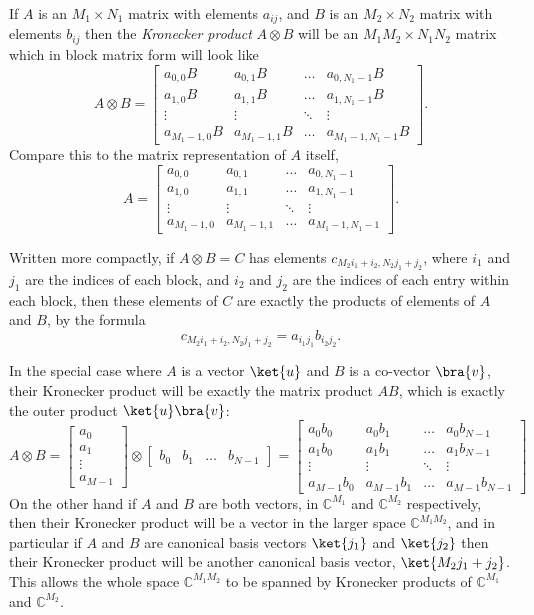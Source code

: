If $A$ is an $M_1 \times N_1$ matrix with elements $a_{ij}$, and $B$ is an $M_2 \times N_2$ matrix with elements $b_{ij}$ then the \emph{Kronecker product} $A \otimes B$ will be an $M_1M_2 \times N_1N_2$ matrix which in block matrix form will look like
\[
A\otimes B = \left[\begin{matrix}
		a_{0,0}B & a_{0,1}B & \dots & a_{0,N_1-1}B\\
		a_{1,0}B & a_{1,1}B & \dots & a_{1,N_1-1}B\\
		\vdots & \vdots & \ddots & \vdots\\
		a_{M_1-1,0}B & a_{M_1-1,1}B & \dots & a_{M_1-1,N_1-1}B
	\end{matrix}\right].
\]
Compare this to the matrix representation of $A$ itself,
\[
	A = \left[\begin{matrix}
	a_{0,0} & a_{0,1} & \dots & a_{0,{N_1-1}}\\
	a_{1,0} & a_{1,1} & \dots & a_{1,{N_1-1}}\\
	\vdots & \vdots & \ddots & \vdots\\
	a_{{M_1-1},0} & a_{{M_1-1},1} & \dots & a_{{M_1-1},{N_1-1}}
\end{matrix}\right].
\]

Written more compactly, if $A\otimes B = C$ has elements $c_{M_2i_1 + i_2,N_2j_1+j_2}$, where $i_1$ and $j_1$ are the indices of each block, and $i_2$ and $j_2$ are the indices of each entry within each block, then these elements of $C$ are exactly the products of elements of $A$ and $B$, by the formula
\[c_{M_2i_1 + i_2,N_2j_1+j_2} = a_{i_1j_1}b_{i_2j_2}.\]

In the special case where $A$ is a vector $\ket{u}$ and $B$ is a co-vector $\bra{v}$, their Kronecker product will be exactly the matrix product $AB$, which is exactly the outer product $\ket{u}\bra{v}$:
\[
A \otimes B =
\left[\begin{matrix}
	a_0\\a_1\\\vdots\\a_{M-1}
\end{matrix}\right]
\otimes
\left[\begin{matrix}
	b_0&b_1&\dots&b_{N-1}
\end{matrix}\right]
=
\left[\begin{matrix}
	a_0b_0 & a_0b_1 & \dots & a_0b_{N-1}\\
	a_1b_0 & a_1b_1 & \dots & a_1b_{N-1}\\
	\vdots & \vdots & \ddots & \vdots\\
	a_{M-1}b_0 & a_{M-1}b_1 & \dots & a_{M-1}b_{N-1}
\end{matrix}\right]
\]
On the other hand if $A$ and $B$ are both vectors, in $\mathbb{C}^{M_1}$ and $\mathbb{C}^{M_2}$ respectively, then their Kronecker product will be a vector in the larger space $\mathbb{C}^{M_1M_2}$, and in particular if $A$ and $B$ are canonical basis vectors $\ket{j_1}$ and $\ket{j_2}$ then their Kronecker product will be another canonical basis vector, $\ket{M_2j_1 + j_2}$. This allows the whole space $\mathbb{C}^{M_1M_2}$ to be spanned by Kronecker products of $\mathbb{C}^{M_1}$ and $\mathbb{C}^{M_2}$.

